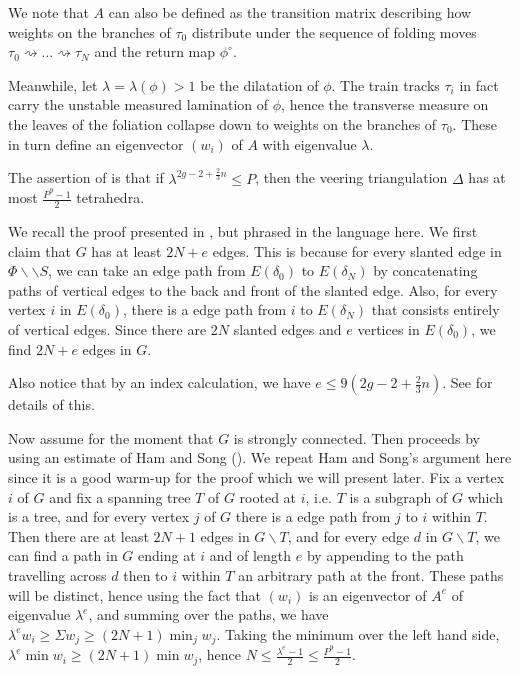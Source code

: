 \documentclass[12pt]{amsart}
\theoremstyle{definition}
\numberwithin{equation}{section}
\begin{document}
We note that $A$ can also be defined as the transition matrix describing how weights on the branches of $\tau_0$ distribute under the sequence of folding moves $\tau_0 \rightsquigarrow ... \rightsquigarrow \tau_N$ and the return map $\phi^\circ$.

Meanwhile, let $\lambda=\lambda(\phi)>1$ be the dilatation of $\phi$. The train tracks $\tau_i$ in fact carry the unstable measured lamination of $\phi$, hence the transverse measure on the leaves of the foliation collapse down to weights on the branches of $\tau_0$. These in turn define an eigenvector $(w_i)$ of $A$ with eigenvalue $\lambda$. 

The assertion of \cite[Theorem 6.2]{Ago11} is that if $\lambda^{2g-2+\frac{2}{3}n} \leq P$, then the veering triangulation $\Delta$ has at most $\frac{P^9-1}{2}$ tetrahedra.

We recall the proof presented in \cite{Ago11}, but phrased in the language here. We first claim that $G$ has at least $2N+e$ edges. This is because for every slanted edge in $\Phi \backslash \backslash S$, we can take an edge path from $E(\delta_0)$ to $E(\delta_N)$ by concatenating paths of vertical edges to the back and front of the slanted edge. Also, for every vertex $i$ in $E(\delta_0)$, there is a edge path from $i$ to $E(\delta_N)$ that consists entirely of vertical edges. Since there are $2N$ slanted edges and $e$ vertices in $E(\delta_0)$, we find $2N+e$ edges in $G$.

Also notice that by an index calculation, we have $e \leq 9(2g-2+\frac{2}{3}n)$. See \cite[Lemma 6.1]{Ago11} for details of this.

Now assume for the moment that $G$ is strongly connected. Then \cite{Ago11} proceeds by using an estimate of Ham and Song (\cite{HS07}). We repeat Ham and Song's argument here since it is a good warm-up for the proof which we will present later. Fix a vertex $i$ of $G$ and fix a spanning tree $T$ of $G$ rooted at $i$, i.e. $T$ is a subgraph of $G$ which is a tree, and for every vertex $j$ of $G$ there is a edge path from $j$ to $i$ within $T$. Then there are at least $2N+1$ edges in $G \backslash T$, and for every edge $d$ in $G \backslash T$, we can find a path in $G$ ending at $i$ and of length $e$ by appending to the path travelling across $d$ then to $i$ within $T$ an arbitrary path at the front. These paths will be distinct, hence using the fact that $(w_i)$ is an eigenvector of $A^e$ of eigenvalue $\lambda^e$, and summing over the paths, we have $\lambda^e w_i \geq \Sigma w_j \geq (2N+1) \min_j w_j$. Taking the minimum over the left hand side, $\lambda^e \min w_i \geq (2N+1) \min w_j$, hence $N \leq \frac{\lambda^e-1}{2} \leq \frac{P^9-1}{2}$.
\end{document}
